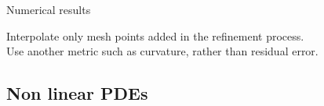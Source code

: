\begin{frame}{Numerical results}
\begin{minipage}{0.1\linewidth}
    \end{minipage} \hspace{5pt}
    \begin{minipage}{0.86\linewidth}
        \vspace{2pt}
        Interpolate only mesh points added in the refinement process. \\

        \vspace{5pt}
        Use another metric such as curvature, rather than residual error.

    \end{minipage}


\end{frame}

\subsection{\filledstar Non linear PDEs}

